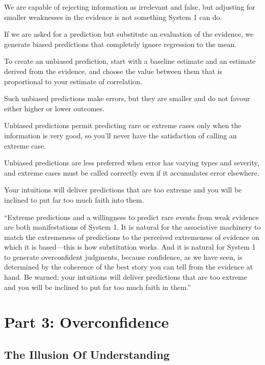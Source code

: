 \bit
\item We are capable of rejecting information as irrelevant and false, but adjusting for smaller weaknesses in the
evidence is not something System 1 can do.
\item If we are asked for a prediction but substitute an evaluation of the evidence, we generate biased predictions
that completely ignore regression to the mean.
\item To create an unbiased prediction, start with a baseline estimate and an estimate derived from the evidence, and
choose the value between them that is proportional to your estimate of correlation.
\item Such unbiased predictions make errors, but they are smaller and do not favour either higher or lower outcomes.
\item Unbiased predictions permit predicting rare or extreme cases only when the information is very good, so you'll
never have the satisfaction of calling an extreme case.
\item Unbiased predictions are less preferred when error has varying types and severity, and extreme cases must be
called correctly even if it accumulates error elsewhere.
\item Your intuitions will deliver predictions that are too extreme and you will be inclined to put far too much
faith into them.
\item ``Extreme predictions and a willingness to predict rare events from weak evidence are both manifestations of
System 1. It is natural for the associative machinery to match the extremeness of predictions to the perceived
extremeness of evidence on which it is based—this is how substitution works. And it is natural for System 1 to
generate overconfident judgments, because confidence, as we have seen, is determined by the coherence of the best
story you can tell from the evidence at hand. Be warned: your intuitions will deliver predictions that are too
extreme and you will be inclined to put far too much faith in them.”
\eit

\section*{Part 3: Overconfidence}

\subsection*{The Illusion Of Understanding}

